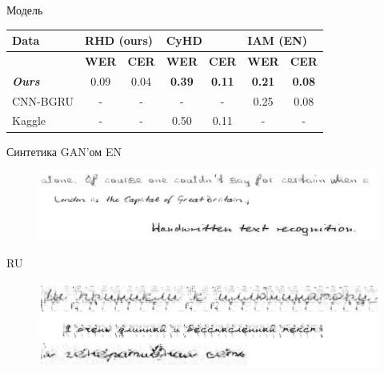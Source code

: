 \documentclass[fleqn, xcolor=x11names]{beamer}
\begin{document}
\begin{frame}{Модель}
    \begin{table}[]
        \begin{tabular}{|l|cc|cc|cc|}
        \hline
        \textbf{Data}          & \multicolumn{2}{l|}{\textbf{RHD (ours)}}                              & \multicolumn{2}{l|}{\textbf{CyHD}}                                     & \multicolumn{2}{l|}{\textbf{IAM (EN)}}                                 \\ \hline
        \textbf{}              & \multicolumn{1}{l|}{\textbf{WER}} & \multicolumn{1}{l|}{\textbf{CER}} & \multicolumn{1}{l|}{\textbf{WER}}  & \multicolumn{1}{l|}{\textbf{CER}} & \multicolumn{1}{l|}{\textbf{WER}}  & \multicolumn{1}{l|}{\textbf{CER}} \\ \hline
        \textit{\textbf{Ours}} & \multicolumn{1}{c|}{0.09}         & 0.04                              & \multicolumn{1}{c|}{\textbf{0.39}} & \textbf{0.11}                     & \multicolumn{1}{c|}{\textbf{0.21}} & \textbf{0.08}                     \\ \hline
        CNN-BGRU               & \multicolumn{1}{c|}{-}            & -                                 & \multicolumn{1}{c|}{-}             & -                                 & \multicolumn{1}{c|}{0.25}          & 0.08                              \\ \hline
        Kaggle                 & \multicolumn{1}{c|}{-}            & -                                 & \multicolumn{1}{c|}{0.50}          & 0.11                              & \multicolumn{1}{c|}{-}             & -                                 \\ \hline
        \end{tabular}
    \end{table}
    
\end{frame}


\begin{frame}{Синтетика GAN'ом}
    EN
    \begin{figure}
        \centering
        \includegraphics[width=\linewidth]{english_gan.png}
    \end{figure}

    \vspace{5pt}
    RU
    \begin{figure}
        \centering
        \includegraphics[width=\linewidth]{russian_gan.png}
    \end{figure}
\end{frame}
\end{document}

